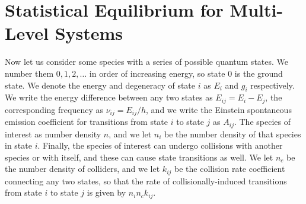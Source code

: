 \section{Statistical Equilibrium for Multi-Level Systems}

Now let us consider some species with a series of possible quantum states. We number them $0, 1, 2, \ldots$ in order of increasing energy, so state $0$ is the ground state. We denote the energy and degeneracy of state $i$ as $E_i$ and $g_i$ respectively. We write the energy difference between any two states as $E_{ij} = E_i - E_j$,  the corresponding frequency as $\nu_{ij} = E_{ij}/h$, and we write the Einstein spontaneous emission coefficient for transitions from state $i$ to state $j$ as $A_{ij}$. The species of interest as number density $n$, and we let $n_i$ be the number density of that species in state $i$. Finally, the species of interest can undergo collisions with another species or with itself, and these can cause state transitions as well. We let $n_c$ be the number density of colliders, and we let $k_{ij}$ be the collision rate coefficient connecting any two states, so that the rate of collisionally-induced transitions from state $i$ to state $j$ is given by $n_i n_c k_{ij}$.

